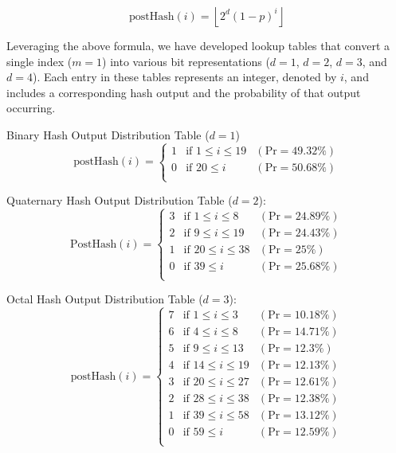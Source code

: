 \begin{equation}
    \text{postHash}(i) = \left\lfloor 2^d \left(1 - p\right)^i \right\rfloor
    \label{eq:GeomFormula}
\end{equation}
    
 
Leveraging the above formula, we have developed lookup tables that convert a single index (\(m = 1\)) into various bit representations (\(d=1\), \(d=2\), \(d=3\), and \(d=4\)). Each entry in these tables represents an integer, denoted by \(i\), and includes a corresponding hash output and the probability of that output occurring.

Binary Hash Output Distribution Table (\(d=1\))
{\renewcommand{\arraystretch}{1.25}
\[
\text{postHash}(i) = \left\{
    \begin{array}{lll}
        \text{1}  & \text{if } 1 \leq i \leq 19 & (\text{Pr} = 49.32\%)
        \\
        \text{0}  & \text{if } 20 \leq i & (\text{Pr} = 50.68\%)
        \\
    \end{array}
\right.    
\]}


Quaternary Hash Output Distribution Table (\(d=2\)):
{\renewcommand{\arraystretch}{1.25}
\[
\text{PostHash}(i) = \left\{
    \begin{array}{lll}
        \text{3}  & \text{if } 1 \leq i \leq 8 & (\text{Pr} = 24.89\%)
        \\
        \text{2}  & \text{if } 9 \leq i \leq 19 & (\text{Pr} = 24.43\%)
        \\
        \text{1}  & \text{if } 20 \leq i \leq 38 & (\text{Pr} = 25\%)
        \\
        \text{0}  & \text{if } 39 \leq i & (\text{Pr} = 25.68\%)
        \\
    \end{array}
\right.    
\]}

Octal Hash Output Distribution Table (\(d=3\)):
{\renewcommand{\arraystretch}{1.25}
\[
\text{postHash}(i) = \left\{
    \begin{array}{lll}
        \text{7}  & \text{if } 1 \leq i \leq 3 & (\text{Pr} = 10.18\%)
        \\
        \text{6}  & \text{if } 4 \leq i \leq 8 & (\text{Pr} = 14.71\%)
        \\
        \text{5}  & \text{if } 9 \leq i \leq 13 & (\text{Pr} = 12.3\%)
        \\
        \text{4}  & \text{if } 14 \leq i \leq 19 & (\text{Pr} = 12.13\%)
        \\
        \text{3}  & \text{if } 20 \leq i \leq 27 & (\text{Pr} = 12.61\%)
        \\
        \text{2}  & \text{if } 28 \leq i \leq 38 & (\text{Pr} = 12.38\%)
        \\
        \text{1}  & \text{if } 39 \leq i \leq 58 & (\text{Pr} = 13.12\%)
        \\
        \text{0}  & \text{if } 59 \leq i & (\text{Pr} = 12.59\%)
        \\
    \end{array}
\right.    
\]}


